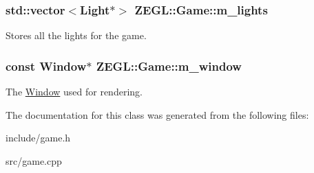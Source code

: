 \subsubsection[{m\+\_\+lights}]{\setlength{\rightskip}{0pt plus 5cm}std\+::vector$<$Light$\ast$$>$ Z\+E\+G\+L\+::\+Game\+::m\+\_\+lights\hspace{0.3cm}{\ttfamily [protected]}}\label{class_z_e_g_l_1_1_game_ab301928901efd034fe40d53cdb54caf5}
Stores all the lights for the game. \hypertarget{class_z_e_g_l_1_1_game_a72107b2460cfd896337dab847801fc1c}{}
\subsubsection[{m\+\_\+window}]{\setlength{\rightskip}{0pt plus 5cm}const {\bf Window}$\ast$ Z\+E\+G\+L\+::\+Game\+::m\+\_\+window\hspace{0.3cm}{\ttfamily [protected]}}\label{class_z_e_g_l_1_1_game_a72107b2460cfd896337dab847801fc1c}
The \hyperlink{class_z_e_g_l_1_1_window}{Window} used for rendering. 

The documentation for this class was generated from the following files\+:\begin{DoxyCompactItemize}
\item 
include/game.\+h\item 
src/game.\+cpp\end{DoxyCompactItemize}
